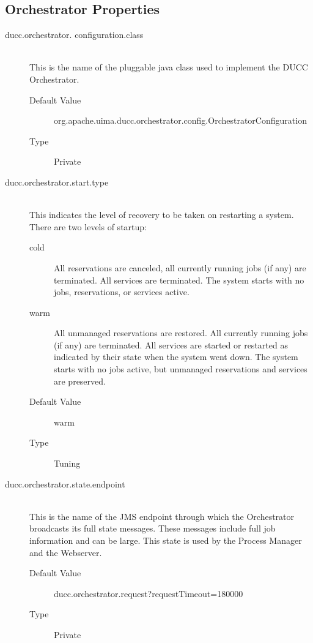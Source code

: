 \subsection{Orchestrator Properties}
    \begin{description}
      \item[ducc.orchestrator. configuration.class] \hfill \\
        This is the name of the pluggable java class used to implement the DUCC Orchestrator. 
        \begin{description}
          \item[Default Value] org.apache.uima.ducc.orchestrator.config.OrchestratorConfiguration 
          \item[Type] Private
        \end{description} 
        
      \item[ducc.orchestrator.start.type] \hfill \\
        This indicates the level of recovery to be taken on restarting a
        system. There are two levels of startup:
        \begin{description}
            \item[cold] All reservations are canceled, all currently running
            jobs (if any) are terminated. All services are terminated. The
            system starts with no jobs, reservations, or services active.

            \item[warm] All unmanaged reservations are restored. All currently
            running jobs (if any) are terminated. All services are started or
            restarted as indicated by their state when the system went down.
            The system starts with no jobs active, but unmanaged reservations
            and services are preserved.

            \item[Default Value] warm 
            \item[Type] Tuning 
        \end{description}
        

      \item[ducc.orchestrator.state.endpoint] \hfill \\
        This is the name of the JMS endpoint through which the Orchestrator broadcasts its full 
        state messages. These messages include full job information and can be large. This state is 
        used by the Process Manager and the Webserver. 
        \begin{description}
          \item[Default Value] ducc.orchestrator.request?requestTimeout=180000
          \item[Type] Private 
        \end{description}


\end{description}
